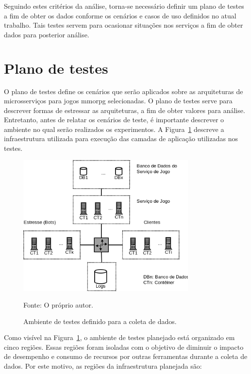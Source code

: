 Seguindo estes critérios da análise, torna-se necessário definir um plano de testes a fim de obter os dados conforme os cenários e casos de uso definidos no atual trabalho.
%
Tais testes servem para ocasionar situações nos serviços a fim de obter dados para posterior análise.



\section {Plano de testes}
\label{sec:plano}



O plano de testes define os cenários que serão aplicados sobre as arquiteturas de microsserviços para jogos \ac{mmorpg} selecionadas.
%
O plano de testes serve para descrever formas de estressar as arquiteturas, a fim de obter valores para análise.
%
Entretanto, antes de relatar os cenários de teste, é importante descrever o ambiente no qual serão realizados os experimentos.
%
A Figura~\ref{Ambiente de testes} descreve a infraestrutura utilizada para execução das camadas de aplicação utilizadas nos testes.



\begin{figure}[htb!]
  \caption{Ambiente de testes definido para a coleta de dados.}
  \label{Ambiente de testes}
  \includegraphics[width=0.8\textwidth]{img/cap3/infraestrutura.png}
  \centering

  Fonte: O próprio autor.
\end{figure}



Como visível na Figura~\ref{Ambiente de testes}, o ambiente de testes planejado está organizado em cinco regiões.
%
Essas regiões foram isoladas com o objetivo de diminuir o impacto de desempenho e consumo de recursos por outras ferramentas durante a coleta de dados.
%
Por este motivo, as regiões da infraestrutura planejada são:



